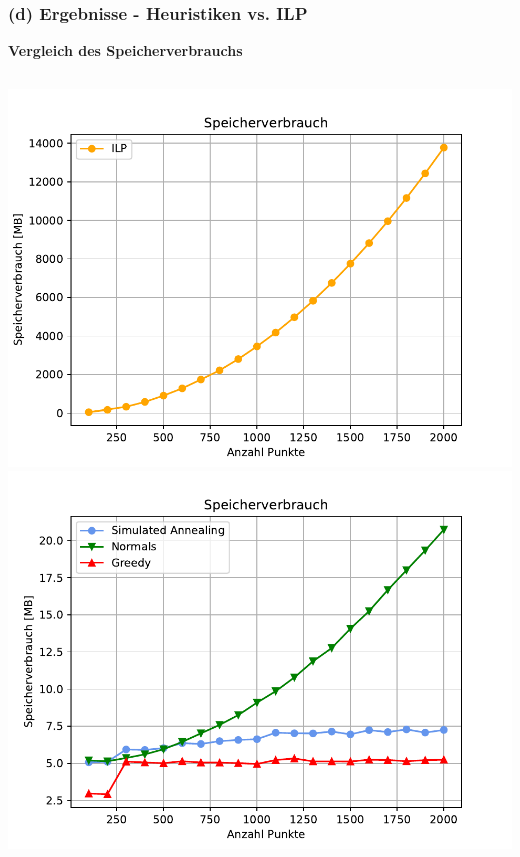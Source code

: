 \documentclass[aspectratio=169]{beamer}
\begin{document}

\begin{frame}
	\frametitle{(d) Ergebnisse - Heuristiken vs. ILP}
	\textbf{Vergleich des Speicherverbrauchs}
	\begin{columns}[c] %
	
	
	\includegraphics[scale=.45]{speicher_ilp.pdf}
	\includegraphics[scale=.45]{speicher_heuristiken.pdf}
	
	

	\end{columns}

	\end{frame}
\end{document}
